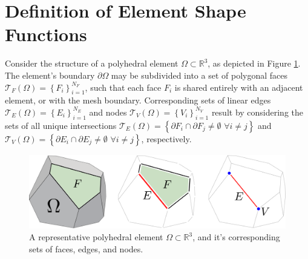 \section{Definition of Element Shape Functions}

	Consider the structure of a polyhedral element $\Omega \subset \mathbb{R}^3$, as depicted in Figure \ref{fig:polyhedral_element}. The element's boundary $\partial \Omega$ may be subdivided into a set of polygonal faces $\mathcal{T}_F (\Omega) = \left\{ F_i \right\}_{i=1}^{N_F}$, such that each face $F_i$ is shared entirely with an adjacent element, or with the mesh boundary. Corresponding sets of linear edges $\mathcal{T}_E (\Omega) = \left\{ E_i \right\}_{i=1}^{N_E}$ and nodes $\mathcal{T}_V (\Omega) = \left\{ V_i \right\}_{i=1}^{N_V}$ result by considering the sets of all unique intersections $\mathcal{T}_E (\Omega) = \left\{ \partial F_i \cap \partial F_j \neq \emptyset \, \, \forall i \neq j \right\}$ and $\mathcal{T}_V (\Omega) = \left\{ \partial E_i \cap \partial E_j \neq \emptyset \, \, \forall i \neq j \right\}$, respectively.
	
\begin{figure} [!ht]
	\centering
	\includegraphics[width = 6.0in]{figures/polyhedron_decomposition.pdf}
	\caption{A representative polyhedral element $\Omega \subset \mathbb{R}^3$, and it's corresponding sets of faces, edges, and nodes.}
	\label{fig:polyhedral_element}
\end{figure}
	
